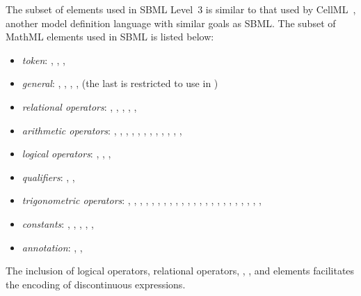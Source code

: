The subset of \mathmltwo elements used in SBML Level~3 is similar
to that used by CellML~\citep{hedley:2001b}, another model
definition language with similar goals as SBML.  The subset of
MathML elements used in SBML is listed below:
\begin{itemize}\setlength{\parskip}{-0.2ex}

\item \emph{token}: , , ,
  
\item \emph{general}: , ,
  , ,  (the last is
  restricted to use in \FunctionDefinition)

\item \emph{relational operators}: , ,
  , , , 

\item \emph{arithmetic operators}: , ,
  , , , ,
  , , , ,
  , , 

\item \emph{logical operators}: , ,
  , 

\item \emph{qualifiers}: , ,

\item \emph{trigonometric operators}: , ,
  , , , ,
  , , , ,
  , , , ,
  , , , ,
  , , ,
  , , 

\item \emph{constants}: , ,
  , , ,

\item \emph{annotation}: , ,

\end{itemize}
\vspace*{-0.75ex}
The inclusion of logical operators, relational operators,
, , and  elements
facilitates the encoding of discontinuous expressions.

